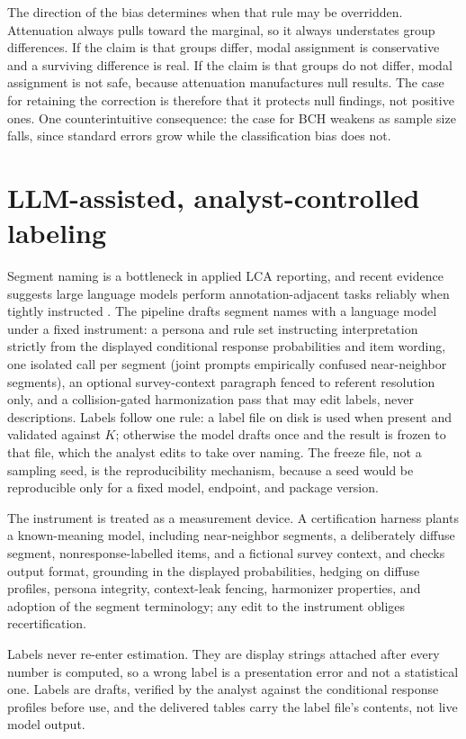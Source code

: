 \documentclass[
  12pt]{article}
\begin{document}
The direction of the bias determines when that rule may be overridden.
Attenuation always pulls toward the marginal, so it always understates
group differences. If the claim is that groups differ, modal assignment
is conservative and a surviving difference is real. If the claim is that
groups do not differ, modal assignment is not safe, because attenuation
manufactures null results. The case for retaining the correction is
therefore that it protects null findings, not positive ones. One
counterintuitive consequence: the case for BCH weakens as sample size
falls, since standard errors grow while the classification bias does
not.

\section{LLM-assisted, analyst-controlled labeling}\label{sec-labeling}

Segment naming is a bottleneck in applied LCA reporting, and recent
evidence suggests large language models perform annotation-adjacent
tasks reliably when tightly instructed \citep{gilardi2023, ziems2024}.
The pipeline drafts segment names with a language model under a fixed
instrument: a persona and rule set instructing interpretation strictly
from the displayed conditional response probabilities and item wording,
one isolated call per segment (joint prompts empirically confused
near-neighbor segments), an optional survey-context paragraph fenced to
referent resolution only, and a collision-gated harmonization pass that
may edit labels, never descriptions. Labels follow one rule: a label
file on disk is used when present and validated against \(K\); otherwise
the model drafts once and the result is frozen to that file, which the
analyst edits to take over naming. The freeze file, not a sampling seed,
is the reproducibility mechanism, because a seed would be reproducible
only for a fixed model, endpoint, and package version.

The instrument is treated as a measurement device. A certification
harness plants a known-meaning model, including near-neighbor segments,
a deliberately diffuse segment, nonresponse-labelled items, and a
fictional survey context, and checks output format, grounding in the
displayed probabilities, hedging on diffuse profiles, persona integrity,
context-leak fencing, harmonizer properties, and adoption of the segment
terminology; any edit to the instrument obliges recertification.

Labels never re-enter estimation. They are display strings attached
after every number is computed, so a wrong label is a presentation error
and not a statistical one. Labels are drafts, verified by the analyst
against the conditional response profiles before use, and the delivered
tables carry the label file's contents, not live model output.
\end{document}
